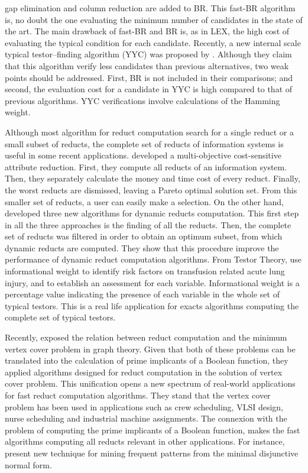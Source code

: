 \documentclass[authoryear,preprint,review,12pt]{elsarticle}
\begin{document}
  gap elimination and column reduction are added to BR. This fast-BR algorithm is, no doubt the one 
  evaluating the minimum number of candidates in the state of the art. The main drawback of fast-BR and 
  BR is, as in LEX, the high cost of evaluating the typical condition for each candidate.
  Recently, a new internal scale typical testor--finding algorithm (YYC) was proposed by \cite{Alba14}. 
  Although they claim that this algorithm verify less candidates than previous alternatives, two weak points should
  be addressed. First, BR is not included in their comparisons; and second, the evaluation cost for a candidate
  in YYC is high compared to that of previous algorithms. YYC verifications involve calculations of the 
  Hamming weight.
  
  
  Although most algorithm for reduct computation search for a single reduct or a small subset of reducts, 
  the complete set of reducts of information systems is useful in some recent applications. \cite{Xu2013}
  developed a multi-objective cost-sensitive attribute reduction. First, they compute all reducts of an 
  information system. Then, they separately calculate the money and time cost of every reduct. Finally, 
  the worst reducts are dismissed, leaving a Pareto optimal solution set. From this smaller set of reducts,
  a user can easily make a selection. On the other hand, \cite{Mukamakuza2014} developed three new algorithms
  for dynamic reducts computation. This first step in all the three approaches is the finding of all the 
  reducts. Then, the complete set of reducts was filtered in order to obtain an optimum subset, from which 
  dynamic reducts are computed. They show that this procedure improve the performance of dynamic reduct 
  computation algorithms.	
  From Testor Theory, \cite{Torres2014} use informational weight to identify risk factors on transfusion 
  related acute lung injury, and to establish an assessment for each variable.  Informational weight is 
  a percentage value indicating the presence of each variable in the whole set of typical testors. This is 
  a real life application for exacts algorithms computing the complete set of typical testors.	
	
  Recently, \cite{chen2015} exposed the relation between reduct computation and the minimum vertex cover
  problem in graph theory. Given that both of these problems can be translated into the calculation of
  prime implicants of a Boolean function, they applied algorithms designed for reduct computation in the
  solution of vertex cover problem. This unification opens a new spectrum of real-world applications for 
  fast reduct computation algorithms. They stand that the vertex cover problem has been used in applications 
  such as crew scheduling, VLSI design, nurse scheduling and industrial machine assignments.
  The connexion with the problem of computing the prime implicants of a Boolean function, makes the fast 
  algorithms computing all reducts relevant in other applications. For instance,\cite{Li2015} present 
  new technique for mining frequent patterns from the minimal disjunctive normal form.
\end{document}
